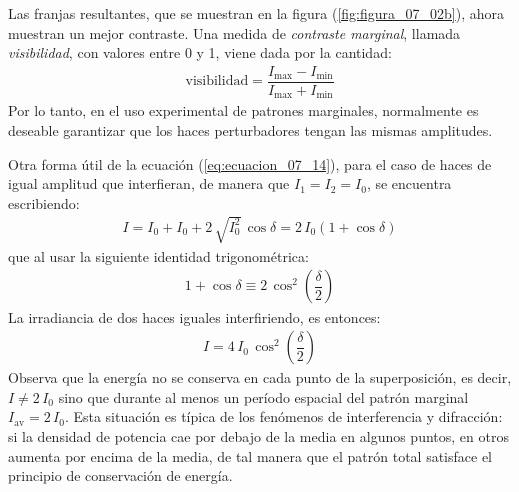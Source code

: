 \documentclass[14pt]{extarticle}
\begin{document}
Las franjas resultantes, que se muestran en la figura (\ref{fig:figura_07_02b}), ahora muestran un mejor contraste. Una medida de \textit{contraste marginal}, llamada \textit{visibilidad}, con valores entre 0 y 1, viene dada por la cantidad:
\begin{align}
\text{visibilidad} = \dfrac{I_{\max} - I_{\min}}{I_{\max} + I_{\min}}
\label{eq:ecuacion_07_17}
\end{align}
Por lo tanto, en el uso experimental de patrones marginales, normalmente es deseable garantizar que los haces perturbadores tengan las mismas amplitudes.

Otra forma útil de la ecuación (\ref{eq:ecuacion_07_14}), para el caso de haces de igual amplitud que interfieran, de manera que $I_{1} = I_{2} = I_{0}$, se encuentra escribiendo:
\begin{align*}
I = I_{0} + I_{0} + 2 \, \sqrt{I_{0}^{2}} \, \cos \delta = 2 \, I_{0} \left( 1 + \cos \delta \right)
\end{align*}
que al usar la siguiente identidad trigonométrica:
\begin{align*}
1 + \cos \delta \equiv 2 \, \cos^{2} \left( \dfrac{\delta}{2} \right)
\end{align*}
La irradiancia de dos haces iguales interfiriendo, es entonces:
\begin{align}
I = 4 \, I_{0} \, \cos^{2} \left( \dfrac{\delta}{2} \right)
\label{eq:ecuacion_07_18}
\end{align}
Observa que la energía no se conserva en cada punto de la superposición, es decir, $I \neq 2 \, I_{0}$ sino que durante al menos un período espacial del patrón marginal $I_{\text{av}} = 2 \, I_{0}$. Esta situación es típica de los fenómenos de interferencia y difracción: si la densidad de potencia cae por debajo de la media en algunos puntos, en otros aumenta por encima de la media, de tal manera que el patrón total satisface el principio de conservación de energía.
\end{document}

